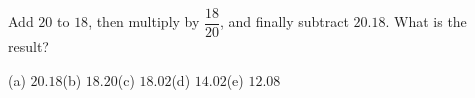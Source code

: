 Add $20$ to $18$, then multiply by $\dfrac{18}{20}$, and finally subtract $20.18$. What is the result?

(a) $20.18$\quad (b) $18.20$\quad (c) $18.02$\quad (d) $14.02$\quad (e) $12.08$
